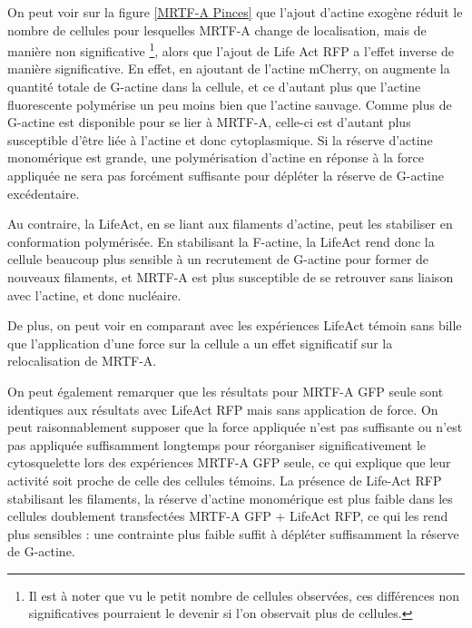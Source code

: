 On peut voir sur la figure \ref{MRTF-A Pinces} que l'ajout d'actine exogène réduit le nombre de cellules pour lesquelles MRTF-A change de localisation, mais de manière non significative  \footnote{ Il est à noter que vu le petit nombre de cellules observées, ces différences non significatives pourraient le devenir si l'on observait plus de cellules. }, alors que l'ajout de Life Act RFP a l'effet inverse de manière significative.
En effet, en ajoutant de l'actine mCherry, on augmente la quantité totale de G-actine dans la cellule, et ce d'autant plus que l'actine fluorescente polymérise un peu moins bien que l'actine sauvage. Comme plus de G-actine est disponible pour se lier à MRTF-A, celle-ci est d'autant plus susceptible d'être liée à l'actine et donc cytoplasmique. 
Si la réserve d'actine monomérique est grande, une polymérisation d'actine en réponse à la force appliquée ne sera pas forcément suffisante pour dépléter la réserve de G-actine excédentaire.

Au contraire, la LifeAct, en se liant aux filaments d'actine, peut les stabiliser en conformation polymérisée. En stabilisant la F-actine, la LifeAct rend donc la cellule beaucoup plus sensible à un recrutement de G-actine pour former de nouveaux filaments, et MRTF-A est plus susceptible de se retrouver sans liaison avec l'actine, et donc nucléaire.

De plus, on peut voir en comparant avec les expériences LifeAct témoin sans bille que l'application d'une force sur la cellule a un effet significatif sur la relocalisation de MRTF-A. 

On peut également remarquer que les résultats pour MRTF-A GFP seule sont identiques aux résultats avec LifeAct RFP mais sans application de force. 
On peut raisonnablement supposer que la force appliquée n'est pas suffisante ou n'est pas appliquée suffisamment longtemps pour réorganiser significativement le cytosquelette lors des expériences MRTF-A GFP seule, ce qui explique que leur activité soit proche de celle des cellules témoins. 
La présence de Life-Act RFP stabilisant les filaments, la réserve d'actine monomérique est plus faible dans les cellules doublement transfectées MRTF-A GFP + LifeAct RFP, ce qui les rend plus sensibles : une contrainte plus faible suffit à dépléter suffisamment la réserve de G-actine. 

